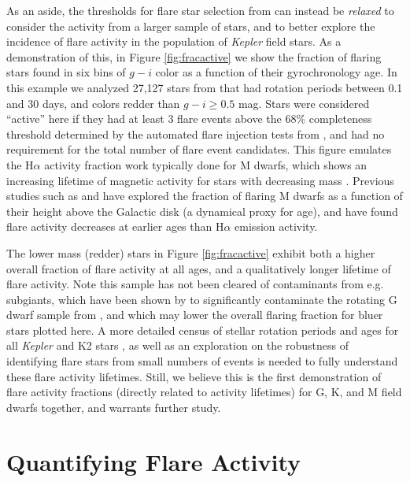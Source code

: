 \documentclass[preprint2]{aastex62}
\newcommand{\Kepler}{\textsl{Kepler}\xspace}
\begin{document}
As an aside, the thresholds for flare star selection from \citet{davenport2016} can instead be {\it relaxed} to consider the activity from a larger sample of stars, and to better explore the incidence of flare activity in the population of \Kepler field stars. As a demonstration of this, in Figure \ref{fig:fracactive} we show the fraction of flaring stars found in six bins of $g-i$ color as a function of their gyrochronology age. In this example we analyzed 27,127 stars from \citet{mcquillan2014} that had rotation periods between 0.1 and 30 days, and colors redder than $g-i \ge 0.5$ mag. Stars were considered ``active'' here if they had at least 3 flare events above the 68\% completeness threshold determined by the automated flare injection tests from \citet{davenport2016}, and had no requirement for the total number of flare event candidates. This figure emulates the H$\alpha$ activity fraction work typically done for M dwarfs, which shows an increasing lifetime of magnetic activity for stars with decreasing mass \citep[e.g.][]{west2008}. Previous studies such as \citet{kowalski2009} and \citet{hilton2010} have explored the fraction of flaring M dwarfs as a function of their height above the Galactic disk (a dynamical proxy for age), and have found flare activity decreases at earlier ages than H$\alpha$ emission activity. 

The lower mass (redder) stars in Figure \ref{fig:fracactive} exhibit both a higher overall fraction of flare activity at all ages, and a qualitatively longer lifetime of flare activity. Note this sample has not been cleared of contaminants from e.g. subgiants, which have been shown by \citet{davenport2017} to significantly contaminate the rotating G dwarf sample from \citet{mcquillan2014}, and which may lower the overall flaring fraction for bluer stars plotted here.  A more detailed census of stellar rotation periods and ages for all \Kepler and K2 stars \citep[e.g. see][]{van-saders2018}, as well as an exploration on the robustness of identifying flare stars from small numbers of events is needed to fully understand these flare activity lifetimes.
Still, we believe this is the first demonstration of flare activity fractions (directly related to activity lifetimes) for G, K, and M field dwarfs together, and warrants further study.





\section{Quantifying Flare Activity}
\label{sec:activity}
\end{document}

